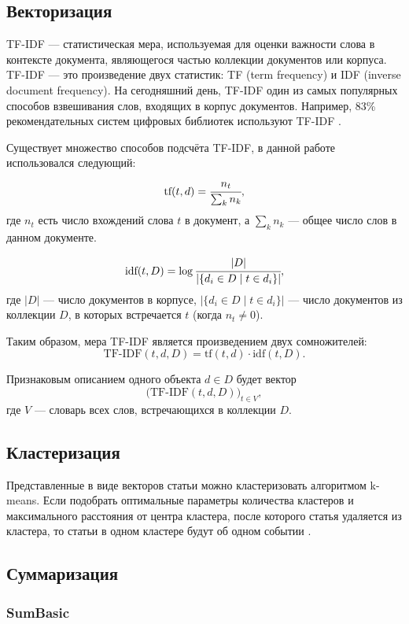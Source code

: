 \documentclass[a4paper, 14pt]{extarticle}
\begin{document}
\subsection{Векторизация}

TF-IDF \cite{doi:10.1108/eb026526} --- статистическая мера, используемая для оценки важности слова в контексте 
документа, являющегося частью коллекции документов или корпуса.
TF-IDF --- это произведение двух статистик: TF (term frequency) и IDF (inverse 
document frequency). На сегодняшний день, TF-IDF один из самых популярных способов взвешивания слов, входящих в корпус документов.
Например, 83\% рекомендательных систем цифровых библиотек используют TF-IDF \cite{Beel2016}.

Существует множество способов подсчёта TF-IDF, в данной работе использовался следующий:
$$
\text{tf}(t, d) = \cfrac{n_t}{\sum_{k} n_k},
$$
где $n_{t}$ есть число вхождений слова $t$ в документ, а $\sum_{k} n_k$ --- общее число слов в данном документе.

$$
\text{idf}(t, D) = \log{ \cfrac{|D|}{|\{ d_i \in D \mid t \in d_i \}|}},
$$
где $|D|$ --- число документов в корпусе, $|\{ d_i \in D \mid t \in d_i \}|$ — число документов из коллекции $D$, в которых встречается 
$t$ (когда $n_{t} \neq 0$).

Таким образом, мера TF-IDF является произведением двух сомножителей:
$$
\text{TF-IDF}(t, d, D) = \text{tf}(t, d) \cdot \text{idf}(t, D).
$$

Признаковым описанием одного объекта $d \in D$ будет вектор
$$
\big(\text{TF-IDF}(t,d,D)\big)_{t\in V},
$$
где $V$ --- словарь всех слов, встречающихся в коллекции $D$.


\subsection{Кластеризация}
Представленные в виде векторов статьи можно кластеризовать алгоритмом k-means. Если подобрать оптимальные параметры количества кластеров и максимального расстояния от центра кластера, после которого статья удаляется из кластера, то статьи в одном кластере будут об одном событии \cite{km}.

\subsection{Суммаризация}
\subsubsection{SumBasic}
\end{document}
